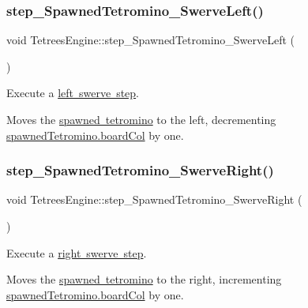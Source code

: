 \subsubsection{\texorpdfstring{step\+\_\+\+Spawned\+Tetromino\+\_\+\+Swerve\+Left()}{step\_SpawnedTetromino\_SwerveLeft()}}
{\footnotesize\ttfamily void Tetrees\+Engine\+::step\+\_\+\+Spawned\+Tetromino\+\_\+\+Swerve\+Left (\begin{DoxyParamCaption}{ }\end{DoxyParamCaption})\hspace{0.3cm}{\ttfamily [private]}}



Execute a \mbox{\hyperlink{TetreesDefs_8hpp_a4d5a793092a473f85b4c1f7faf62afeda3b27946656fc3bf9470a8b7761cfa8e1}{left swerve step}}. 

Moves the \mbox{\hyperlink{classTetreesEngine_a26435ee2f02d9ba70d9e359745114f6e}{spawned tetromino}} to the left, decrementing \mbox{\hyperlink{structpiece__t}{spawned\+Tetromino.board\+Col}} by one. \mbox{\label{classTetreesEngine_a46e1950877c8b8aa7e988ca3de14ad18}} 
\subsubsection{\texorpdfstring{step\+\_\+\+Spawned\+Tetromino\+\_\+\+Swerve\+Right()}{step\_SpawnedTetromino\_SwerveRight()}}
{\footnotesize\ttfamily void Tetrees\+Engine\+::step\+\_\+\+Spawned\+Tetromino\+\_\+\+Swerve\+Right (\begin{DoxyParamCaption}{ }\end{DoxyParamCaption})\hspace{0.3cm}{\ttfamily [private]}}



Execute a \mbox{\hyperlink{TetreesDefs_8hpp_a4d5a793092a473f85b4c1f7faf62afeda86fdea6e730f10b7d265b067552624d3}{right swerve step}}. 

Moves the \mbox{\hyperlink{classTetreesEngine_a26435ee2f02d9ba70d9e359745114f6e}{spawned tetromino}} to the right, incrementing \mbox{\hyperlink{structpiece__t}{spawned\+Tetromino.board\+Col}} by one. \mbox{\label{classTetreesEngine_a446196c2260e2ce2ac0d18848ee6b636}} 
